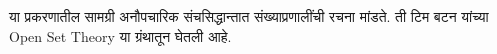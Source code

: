 \documentclass[../../../include/open-logic-section]{subfiles}
\begin{document}
	

\begin{editorial}
या प्रकरणातील सामग्री अनौपचारिक संचसिद्धान्तात संख्याप्रणालींची रचना
मांडते. ती टिम बटन यांच्या Open Set Theory या ग्रंथातून घेतली आहे.
\end{editorial}


\OLEndChapterHook
\end{document}
